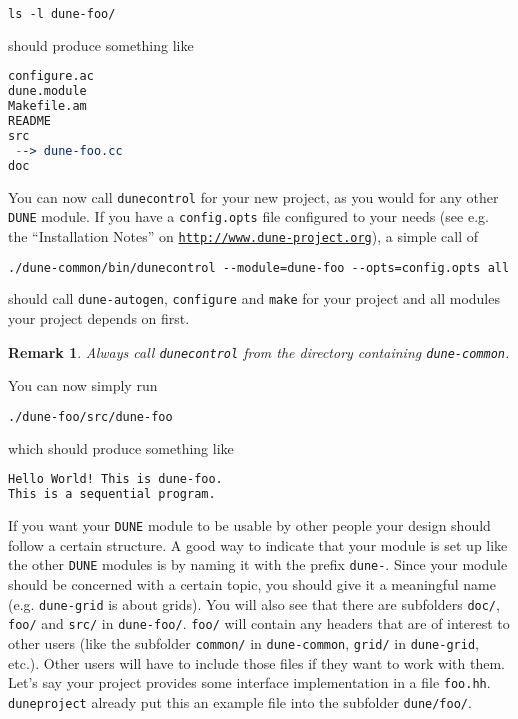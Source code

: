 \documentclass[11pt,a4paper,headinclude,footinclude,DIV16,normalheadings]{scrartcl}
\newtheorem{remark}{Remark}[section]
\newcommand{\dune}{\texttt{DUNE}\xspace}
\newcommand{\autogen}{\texttt{dune-autogen}\xspace}
\newcommand{\configure}{\texttt{configure}\xspace}
\newcommand{\dunecommon}{\texttt{dune-common}\xspace}
\newcommand{\dunegrid}{\texttt{dune-grid}\xspace}
\newcommand{\dunecontrol}{\texttt{dunecontrol}\xspace}
\newcommand{\duneproject}{\texttt{duneproject}\xspace}
\newcommand{\make}{\texttt{make}\xspace}
\begin{document}
\begin{lstlisting}[language=make]
ls -l dune-foo/
\end{lstlisting}
should produce something like

\begin{lstlisting}[language=make]
configure.ac
dune.module
Makefile.am
README
src
 --> dune-foo.cc
doc
\end{lstlisting}

You can now call \dunecontrol for your new project, as you would for any other \dune module. If you have a \texttt{config.opts}\xspace
file configured to your needs (see e.g. the ``Installation Notes'' on
\texttt{\url{http://www.dune-project.org}}), a simple call of

\begin{lstlisting}[language=make]
./dune-common/bin/dunecontrol --module=dune-foo --opts=config.opts all
\end{lstlisting}
should call \autogen, \configure and \make for your
project and all modules your project depends on first.

\begin{remark}
Always call \dunecontrol from the directory containing \dunecommon.
\end{remark}

You can now  simply run

\begin{lstlisting}[language=make]
./dune-foo/src/dune-foo
\end{lstlisting}
which should produce something like

\begin{lstlisting}[language=make]
Hello World! This is dune-foo.
This is a sequential program.
\end{lstlisting}

If you want your \dune module to be usable by other people your
design should follow a certain structure. A good way to indicate that
your module is set up like the other \dune modules is by naming it
with the prefix \texttt{dune-}\xspace.  Since your module should be
concerned with a certain topic, you should give it a meaningful name
(e.g. \dunegrid is about grids).  You will also see that there are
subfolders \texttt{doc/}\xspace, \texttt{foo/}\xspace and
\texttt{src/}\xspace in \texttt{dune-foo/}\xspace.
\texttt{foo/}\xspace will contain any headers that are of interest to
other users (like the subfolder \texttt{common/}\xspace in
\dunecommon, \texttt{grid/}\xspace in \dunegrid, etc.). Other users
will have to include those files if they want to work with them. Let's
say your project provides some interface implementation in a file
\texttt{foo.hh}\xspace. \duneproject already put this an example file
into the subfolder \texttt{dune/foo/}.
\end{document}
